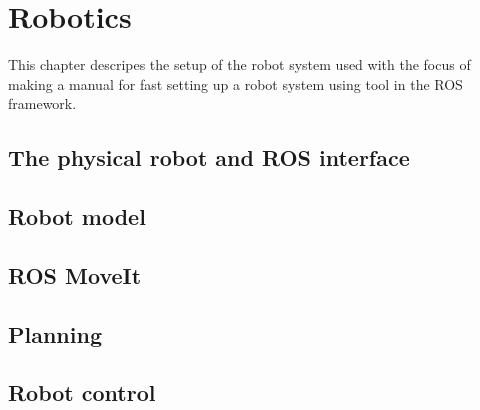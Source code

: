 \chapter{Robotics}
This chapter descripes the setup of the robot system used with the focus of making a manual for fast setting up a robot system using tool in the ROS framework. 


\section{The physical robot and ROS interface}
\section{Robot model}
\section{ROS MoveIt}
\section{Planning}
\section{Robot control}

%
